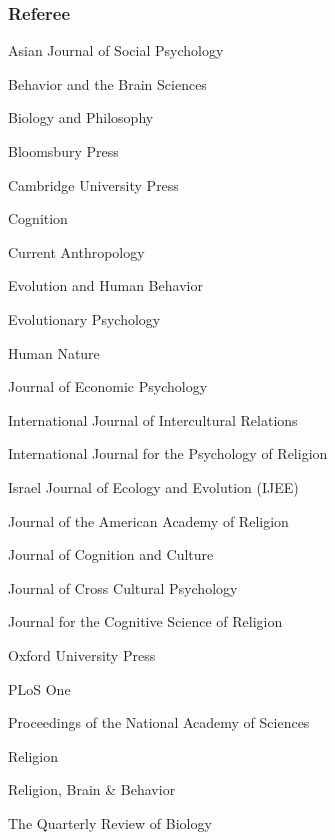 \documentclass{article}
\begin{document}
\subsubsection*{Referee}
\begin{description}
\item  Asian Journal of Social Psychology
\item  Behavior and the Brain Sciences
\item  Biology and Philosophy
\item  Bloomsbury Press
\item  Cambridge University Press 
\item  Cognition
\item  Current Anthropology
\item  Evolution and Human Behavior
\item  Evolutionary Psychology
\item  Human Nature
\item  Journal of Economic Psychology
\item  International Journal of Intercultural Relations
\item  International Journal for the Psychology of Religion
\item  Israel Journal of Ecology and Evolution (IJEE)
\item  Journal of the American Academy of Religion
\item  Journal of Cognition and Culture
\item  Journal of Cross Cultural Psychology
\item  Journal for the Cognitive Science of Religion
\item  Oxford University Press
\item  PLoS One
\item  Proceedings of the National Academy of Sciences
\item  Religion
\item  Religion, Brain \& Behavior
\item  The Quarterly Review of Biology
\end{description}
\end{document}
